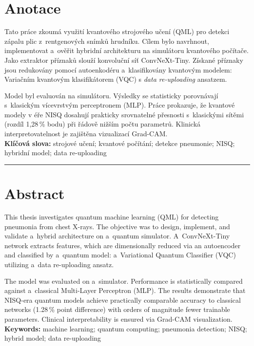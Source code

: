 \documentclass[12pt, a4paper]{report}
\begin{document}
\section*{Anotace}
Tato práce zkoumá využití kvantového strojového učení (QML) pro detekci zápalu plic z~rentgenových snímků hrudníku. Cílem bylo navrhnout, implementovat a~ověřit hybridní architekturu na simulátoru kvantového počítače. Jako extraktor příznaků slouží konvoluční síť ConvNeXt-Tiny. Získané příznaky jsou redukovány pomocí autoenkodéru a~klasifikovány kvantovým modelem: Variačním kvantovým klasifikátorem (VQC) s \textit{data re-uploading} ansatzem.

Model byl evaluován na simulátoru. Výsledky se statisticky porovnávají s~klasickým vícevrstvým perceptronem (MLP). Práce prokazuje, že kvantové modely v éře NISQ dosahují prakticky srovnatelné přesnosti s~klasickými sítěmi (rozdíl 1{,}28\,\% bodu) při řádově nižším počtu parametrů. Klinická interpretovatelnost je zajištěna vizualizací Grad-CAM. \\

\textbf{Klíčová slova:} strojové učení; kvantové počítání; detekce pneumonie; NISQ; hybridní model; data re-uploading

\vspace{0.5cm}
\hrule
\vspace{0.5cm}

\section*{Abstract}
This thesis investigates quantum machine learning (QML) for detecting pneumonia from chest X-rays. The objective was to design, implement, and validate a~hybrid architecture on a~quantum simulator. A~ConvNeXt-Tiny network extracts features, which are dimensionally reduced via an autoencoder and classified by a~quantum model: a~Variational Quantum Classifier (VQC) utilizing a~data re-uploading ansatz.

The model was evaluated on a~simulator. Performance is statistically compared against a~classical Multi-Layer Perceptron (MLP). The results demonstrate that NISQ-era quantum models achieve practically comparable accuracy to classical networks (1.28\,\% point difference) with orders of magnitude fewer trainable parameters. Clinical interpretability is ensured via Grad-CAM visualization. \\

\textbf{Keywords:} machine learning; quantum computing; pneumonia detection; NISQ; hybrid model; data re-uploading
\end{document}
